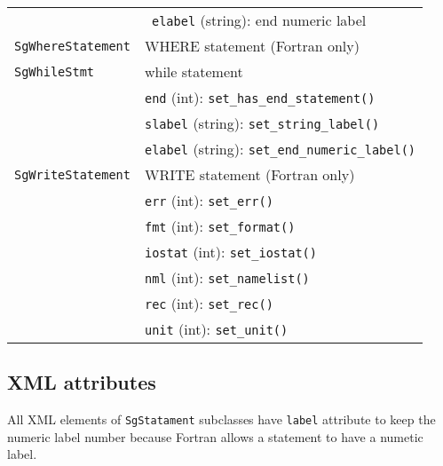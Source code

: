 \begin{longtable}[l]{l|p{10cm}}
 & ~\texttt{elabel} (string): end numeric label\\
 \texttt{SgWhereStatement}& WHERE statement (Fortran only)\\
 \texttt{SgWhileStmt}& while statement\\
 & \texttt{end} (int): \texttt{set\_has\_end\_statement()}\\
 & \texttt{slabel} (string): \texttt{set\_string\_label()}\\
 & \texttt{elabel} (string): \texttt{set\_end\_numeric\_label()}\\
 \texttt{SgWriteStatement}& WRITE statement (Fortran only)\\
 & \texttt{err} (int): \texttt{set\_err()}\\
 & \texttt{fmt} (int): \texttt{set\_format()}\\
 & \texttt{iostat} (int): \texttt{set\_iostat()}\\
 & \texttt{nml} (int): \texttt{set\_namelist()}\\
 & \texttt{rec} (int): \texttt{set\_rec()}\\
 & \texttt{unit} (int): \texttt{set\_unit()}\\
 \end{longtable}

\subsection{XML attributes}\label{sec:stmtatt}
All XML elements of \texttt{SgStatament} subclasses have \texttt{label}
attribute to keep the numeric label number because Fortran allows a
statement to have a numetic label.

